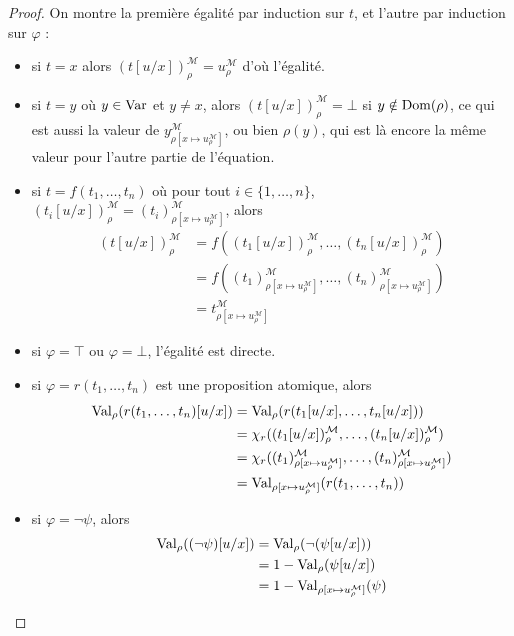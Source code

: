 \begin{proof}
  On montre la première égalité par induction sur $t$, et l'autre par induction
  sur $\varphi$ :
  \begin{itemize}
  \item si $t = x$ alors $(t[u/x])_\rho^\mathcal M = u^\mathcal M_\rho$ d'où
    l'égalité.
  \item si $t = y$ où $y\in\operatorname{Var}$ et $y\neq x$, alors
    $(t[u/x])_\rho^\mathcal M = \bot$ si $y\notin\operatorname{Dom}(\rho)$, ce qui est aussi
    la valeur de $y^\mathcal M_{\rho[x \mapsto u^\mathcal M_\rho]}$, ou bien
    $\rho(y)$, qui est là encore la même valeur pour l'autre partie de
    l'équation.
  \item si $t = f(t_1,\ldots,t_n)$ où pour tout $i\in\{1,\ldots,n\}$,
    $(t_i[u/x])^\mathcal M_\rho = (t_i)^\mathcal M_{\rho[x\mapsto u^\mathcal M_\rho]}$, alors
    \begin{align*}
      (t[u/x])^\mathcal M_\rho &= f((t_1[u/x])^\mathcal M_\rho,\ldots,
      (t_n[u/x])^\mathcal M_\rho)\\
      &= f((t_1)^\mathcal M_{\rho[x\mapsto u^\mathcal M_\rho]},\ldots,
      (t_n)^\mathcal M_{\rho[x\mapsto u^\mathcal M_\rho]})\\
      &= t^\mathcal M_{\rho[x\mapsto u^\mathcal M_\rho]}
    \end{align*}
  \item si $\varphi = \top$ ou $\varphi = \bot$, l'égalité est directe.
  \item si $\varphi = r(t_1,\ldots,t_n)$ est une proposition atomique, alors
    \begin{align*}
      \operatorname{Val}_\rho(r(t_1,\ldots,t_n)[u/x])
      &= \operatorname{Val}_\rho(r(t_1[u/x],\ldots,t_n[u/x]))\\
      &= \chi_r((t_1[u/x])^\mathcal M_\rho,\ldots,(t_n[u/x])^\mathcal M_\rho)\\
      &= \chi_r((t_1)^\mathcal M_{\rho[x\mapsto u^\mathcal M_\rho]},\ldots,
      (t_n)^\mathcal M_{\rho[x\mapsto u^\mathcal M_\rho]})\\
      &= \operatorname{Val}_{\rho[x\mapsto u^\mathcal M_\rho]}(r(t_1,\ldots,t_n))
    \end{align*}
  \item si $\varphi = \lnot \psi$, alors
    \begin{align*}
      \Val_\rho((\lnot \psi)[u/x]) &= \Val_\rho(\lnot (\psi[u/x]))\\
      &= 1 - \Val_\rho(\psi[u/x])\\
      &= 1 - \Val_{\rho[x\mapsto u^\mathcal M_\rho]}(\psi)\\

\end{align*}
\end{itemize}
\end{proof}
